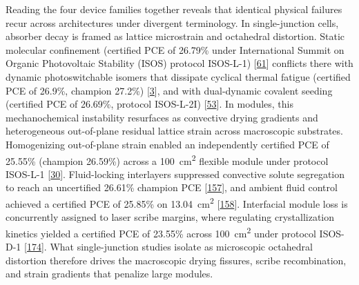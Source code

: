 \documentclass[
  11pt,
]{article}
\begin{document}
Reading the four device families together reveals that identical
physical failures recur across architectures under divergent
terminology. In single-junction cells, absorber decay is framed as
lattice microstrain and octahedral distortion. Static molecular
confinement (certified PCE of 26.79\% under International Summit on
Organic Photovoltaic Stability (ISOS) protocol ISOS-L-1)
{[}\href{https://doi.org/10.1038/s41467-026-72115-2}{61}{]} conflicts
there with dynamic photoswitchable isomers that dissipate cyclical
thermal fatigue (certified PCE of 26.9\%, champion 27.2\%)
{[}\href{https://doi.org/10.1038/s41560-026-01993-z}{3}{]}, and with
dual-dynamic covalent seeding (certified PCE of 26.69\%, protocol
ISOS-L-2I) {[}\href{https://doi.org/10.1002/adma.72823}{53}{]}. In
modules, this mechanochemical instability resurfaces as convective
drying gradients and heterogeneous out-of-plane residual lattice strain
across macroscopic substrates. Homogenizing out-of-plane strain enabled
an independently certified PCE of 25.55\% (champion 26.59\%) across a
\qty{100}{\centi\meter\squared} flexible module under protocol ISOS-L-1
{[}\href{https://doi.org/10.1126/sciadv.aec3238}{30}{]}. Fluid-locking
interlayers suppressed convective solute segregation to reach an
uncertified 26.61\% champion PCE
{[}\href{https://doi.org/10.1002/adma.202518582}{157}{]}, and ambient
fluid control achieved a certified PCE of 25.85\% on
\qty{13.04}{\centi\meter\squared}
{[}\href{https://doi.org/10.1002/adma.73373}{158}{]}. Interfacial module
loss is concurrently assigned to laser scribe margins, where regulating
crystallization kinetics yielded a certified PCE of 23.55\% across
\qty{100}{\centi\meter\squared} under protocol ISOS-D-1
{[}\href{https://doi.org/10.1038/s41467-026-69685-6}{174}{]}. What
single-junction studies isolate as microscopic octahedral distortion
therefore drives the macroscopic drying fissures, scribe recombination,
and strain gradients that penalize large modules.
\end{document}
